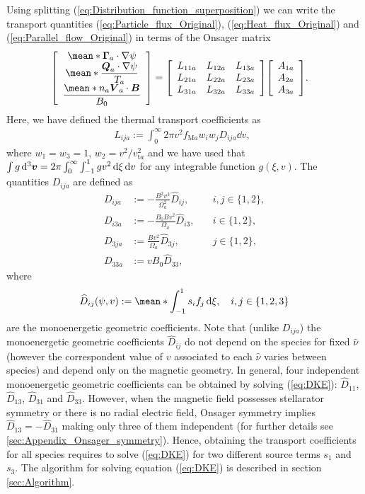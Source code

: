 \documentclass[10pt]{iopart}
\newcommand{\Matrix}[2]
{
	\mleft[
	\begin{array}{#1}
		#2
	\end{array}
	\mright]
}
\begin{document}
Using splitting (\ref{eq:Distribution_function_superposition}) we can write the transport quantities (\ref{eq:Particle_flux_Original}), (\ref{eq:Heat_flux_Original}) and (\ref{eq:Parallel_flow_Original}) in terms of the Onsager matrix
%
\begin{align}
	&\Matrix{c}
	{
		\mean*{\vb*{\Gamma}_a \cdot \nabla \psi} \\
		\mean*{ \dfrac{\vb*{Q}_a \cdot \nabla \psi}{T_a} }     \\ 
		\dfrac{\mean*{n_a \vb*{V}_{a} \cdot\vb*{B}}}{B_0}
	}
	=
	\Matrix{ccc}
	{
		L_{11a} & L_{12a}  & L_{13a} \\
		L_{21a} & L_{22a}  & L_{23a} \\
		L_{31a} & L_{32a}  & L_{33a} 
	}
	\Matrix{c}
	{ 
		A_{1a} \\
		A_{2a} \\
		A_{3a} 
	}.
\end{align}
Here, we have defined the thermal transport coefficients as 
%
\begin{align}
	L_{ija} :=    
	\int_{0}^{\infty}
	2\pi v^2
	f_{\text{M}a} 
	w_i w_j 
	D_{ija} 
	\dd{v}, \ \ %
\end{align}
where $w_1=w_3=1$, $w_2=v^2/v_{\text{t}a}^2$ and we have used that $\int g\dd[3]{\vb*{v}} = 2\pi \int_{0}^{\infty}\int_{-1}^{1} g v^2 \dd{\xi}\dd{v}$ for any integrable function $g(\xi,v)$. The quantities $D_{ija}$ are defined as
%
\begin{align}
	D_{ija} & :=-\frac{B^2v^3}{\Omega_a^2} \widehat{D}_{ij}, &\quad i,j \in\{1,2\},
	\\
	D_{i3a} & :=  
	- \frac{B_0 B v^2}{\Omega_a} \widehat{D}_{i3}, &\quad i \in\{1,2\},
	\\
	D_{3ja} & := \frac{B v^2}{\Omega_a} \widehat{D}_{3j}, &\quad j \in\{1,2\},
	\\
	D_{33a} & := v B_0 \widehat{D}_{33}, &
\end{align}
where  
%
\begin{align}
	\widehat{D}_{ij}(\psi,v) := \mean*{ \int_{-1}^{1}  s_i f_j   \dd{\xi} }, \quad i,j\in\{1,2,3\}
	\label{eq:Monoenergetic_geometric_coefficients}
\end{align} 
are the monoenergetic geometric coefficients. Note that (unlike $D_{ija}$) the monoenergetic geometric coefficients $\widehat{D}_{ij}$ do not depend on the species for fixed $\hat{\nu}$ (however the correspondent value of $v$ associated to each $\hat{\nu}$ varies between species) and depend only on the magnetic geometry. In general, four independent monoenergetic geometric coefficients can be obtained by solving (\ref{eq:DKE}): $\widehat{D}_{11}$, $\widehat{D}_{13}$, $\widehat{D}_{31}$ and $\widehat{D}_{33}$. However, when the magnetic field possesses stellarator symmetry \cite{DEWAR1998275} or there is no radial electric field, Onsager symmetry implies $\widehat{D}_{13} = -\widehat{D}_{31}$ \cite{VanRij_1989} making only three of them independent (for further details see \ref{sec:Appendix_Onsager_symmetry}). Hence, obtaining the transport coefficients for all species requires to solve (\ref{eq:DKE}) for two different source terms $s_1$ and $s_3$. The algorithm for solving equation (\ref{eq:DKE}) is described in section \ref{sec:Algorithm}. 
\end{document}
